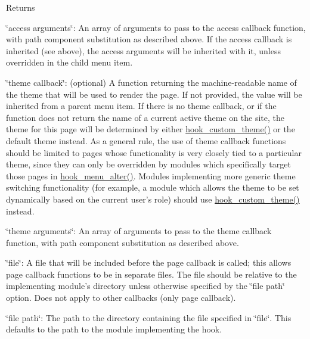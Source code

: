 \begin{DoxyReturn}{Returns}
\begin{DoxyItemize}
\item \char`\"{}access arguments\char`\"{}: An array of arguments to pass to the access callback function, with path component substitution as described above. If the access callback is inherited (see above), the access arguments will be inherited with it, unless overridden in the child menu item.
\item \char`\"{}theme callback\char`\"{}: (optional) A function returning the machine-\/readable name of the theme that will be used to render the page. If not provided, the value will be inherited from a parent menu item. If there is no theme callback, or if the function does not return the name of a current active theme on the site, the theme for this page will be determined by either \hyperlink{group__hooks_gab83dce4ef80bc5005ee0de98fc005b1f}{hook\_\-custom\_\-theme()} or the default theme instead. As a general rule, the use of theme callback functions should be limited to pages whose functionality is very closely tied to a particular theme, since they can only be overridden by modules which specifically target those pages in \hyperlink{group__hooks_ga4c37deddcf48dbfe6f3081df1652f6fa}{hook\_\-menu\_\-alter()}. Modules implementing more generic theme switching functionality (for example, a module which allows the theme to be set dynamically based on the current user's role) should use \hyperlink{group__hooks_gab83dce4ef80bc5005ee0de98fc005b1f}{hook\_\-custom\_\-theme()} instead.
\item \char`\"{}theme arguments\char`\"{}: An array of arguments to pass to the theme callback function, with path component substitution as described above.
\item \char`\"{}file\char`\"{}: A file that will be included before the page callback is called; this allows page callback functions to be in separate files. The file should be relative to the implementing module's directory unless otherwise specified by the \char`\"{}file path\char`\"{} option. Does not apply to other callbacks (only page callback).
\item \char`\"{}file path\char`\"{}: The path to the directory containing the file specified in \char`\"{}file\char`\"{}. This defaults to the path to the module implementing the hook.

\end{DoxyItemize}
\end{DoxyReturn}

